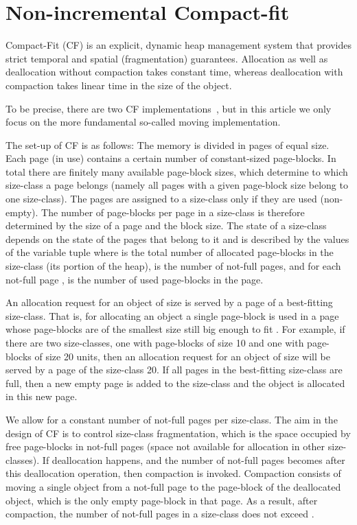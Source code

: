 \documentclass{amsart}
\begin{document}
\section{Non-incremental Compact-fit}
\label{sec:non-inc-cf}

Compact-Fit (CF) is an explicit, dynamic heap management system that provides
strict temporal and spatial (fragmentation) guarantees.
Allocation as well as deallocation without compaction takes
constant time, whereas deallocation with compaction takes linear time
in the size of the object.



To be precise, there are two CF implementations~\cite{USENIX08}, but
in this article we only focus on the more fundamental so-called moving
implementation.

The set-up of CF is as follows: The memory is divided in pages of
equal size. Each page (in use) contains a certain number of
constant-sized page-blocks. In total there are finitely many available
page-block sizes, which determine to which size-class a page belongs
(namely all pages with a given page-block size belong to one
size-class). The pages are assigned to a size-class only if they are
used (non-empty). The number of page-blocks  per page in a
size-class is therefore determined by the size of a page and the block
size. The state of a size-class depends on the state of the pages that
belong to it and is described by the values of the variable tuple
 where  is the total number of
allocated page-blocks in the size-class (its portion of the heap), 
is the number of not-full pages, and for each not-full page , 
is the number of used page-blocks in the page.

An allocation request for an object of size  is served by a page of
a best-fitting size-class. That is, for allocating an object a single
page-block is used in a page whose page-blocks are of the smallest
size still big enough to fit . For example, if there are two
size-classes, one with page-blocks of size 10 and one with page-blocks
of size 20 units, then an allocation request for an object of size  will be served by a page of the size-class
20. If all pages in the best-fitting size-class are full, then a new
empty page is added to the size-class and the object is allocated in
this new page.

We allow for a constant number  of not-full pages per
size-class.  The aim in the design of CF is to control size-class
fragmentation, which is the space occupied by free page-blocks in
not-full pages (space not available for allocation in other
size-classes).  If deallocation happens, and the number of not-full
pages becomes  after this deallocation operation, then
compaction is invoked.  Compaction consists of moving a single object
from a not-full page to the page-block of the deallocated object,
which is the only empty page-block in that page.  As a result, after
compaction, the number of not-full pages in a size-class does not
exceed .
\end{document}
